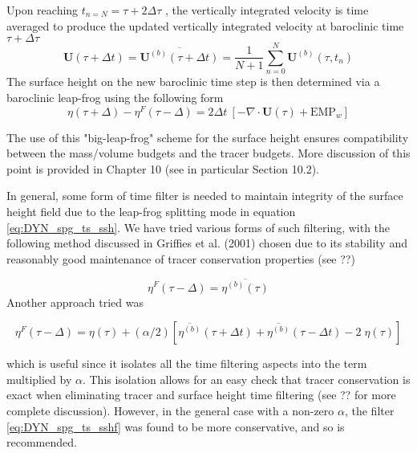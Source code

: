 \documentclass[../tex_main/NEMO_manual]{subfiles}
\begin{document}
Upon reaching $t_{n=N} = \tau + 2\Delta \tau$ , the vertically integrated velocity is time averaged to
produce the updated vertically integrated velocity at baroclinic time $\tau + \Delta \tau$ 
\begin{equation} \label{eq:DYN_spg_ts_u}
\textbf{U}(\tau+\Delta t) = \overline{\textbf{U}^{(b)}(\tau+\Delta t)} 
 	= \frac{1}{N+1} \sum\limits_{n=0}^N\textbf{U}^{(b)}(\tau,t_{n})
\end{equation}
The surface height on the new baroclinic time step is then determined via
a baroclinic leap-frog using the following form 
\begin{equation} \label{eq:DYN_spg_ts_ssh}
\eta(\tau+\Delta) - \eta^{F}(\tau-\Delta) = 2\Delta t \ \left[ - \nabla \cdot \textbf{U}(\tau) + \text{EMP}_w \right]  
\end{equation}

The use of this "big-leap-frog" scheme for the surface height ensures compatibility between
the mass/volume budgets and the tracer budgets.
More discussion of this point is provided in Chapter 10 (see in particular Section 10.2). 
 
In general, some form of time filter is needed to maintain integrity of the surface height field due to
the leap-frog splitting mode in equation \autoref{eq:DYN_spg_ts_ssh}.
We have tried various forms of such filtering,
with the following method discussed in Griffies et al. (2001) chosen due to its stability and
reasonably good maintenance of tracer conservation properties (see ??) 

\begin{equation} \label{eq:DYN_spg_ts_sshf}
\eta^{F}(\tau-\Delta) =  \overline{\eta^{(b)}(\tau)} 
\end{equation}
Another approach tried was 

\begin{equation} \label{eq:DYN_spg_ts_sshf2}
\eta^{F}(\tau-\Delta) = \eta(\tau) 
	+ (\alpha/2) \left[\overline{\eta^{(b)}}(\tau+\Delta t)
				    + \overline{\eta^{(b)}}(\tau-\Delta t) -2 \;\eta(\tau) \right]
\end{equation}

which is useful since it isolates all the time filtering aspects into the term multiplied by $\alpha$.
This isolation allows for an easy check that tracer conservation is exact when eliminating tracer and
surface height time filtering (see ?? for more complete discussion).
However, in the general case with a non-zero $\alpha$, the filter \autoref{eq:DYN_spg_ts_sshf} was found to
be more conservative, and so is recommended. 
\end{document}
